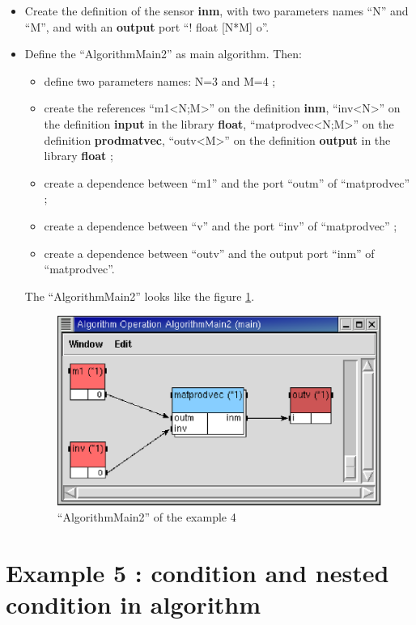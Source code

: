 \documentclass[a4paper,twoside]{report}
\begin{document}
\begin{itemize}
\item Create the definition of the sensor \textbf{inm}, with two parameters
names ``N'' and ``M'', and with an \textbf{output} port ``!  float
[N*M] o''.

\item Define the ``AlgorithmMain2'' as main algorithm. Then:
\begin{itemize}
\item define two parameters names: N=3 and M=4 ;

\item create the references ``m1<N;M>'' on the definition \textbf{inm},
``inv<N>'' on the definition \textbf{input} in the library \textbf{float},
``matprodvec<N;M>'' on the definition \textbf{prodmatvec}, ``outv<M>'' on
the definition \textbf{output} in the library \textbf{float} ;

\item create a dependence between ``m1'' and the port ``outm'' of ``matprodvec'' ;

\item create a dependence between ``v'' and the port ``inv'' of ``matprodvec'' ;

\item create a dependence between ``outv'' and the output port ``inm'' of
``matprodvec''.
\end{itemize}
The ``AlgorithmMain2'' looks like the figure \ref{algomain2_4}.

\begin{figure}[htbp]
  \begin{center} 
        \includegraphics[width=0.55\linewidth]{algorithmMain2_ex4.eps} 
  \end{center}
  \caption{``AlgorithmMain2'' of the example 4}
  \label{algomain2_4}
\end{figure}

\end{itemize}

\chapter{Example 5 : condition and nested condition in
algorithm}
\end{document}
